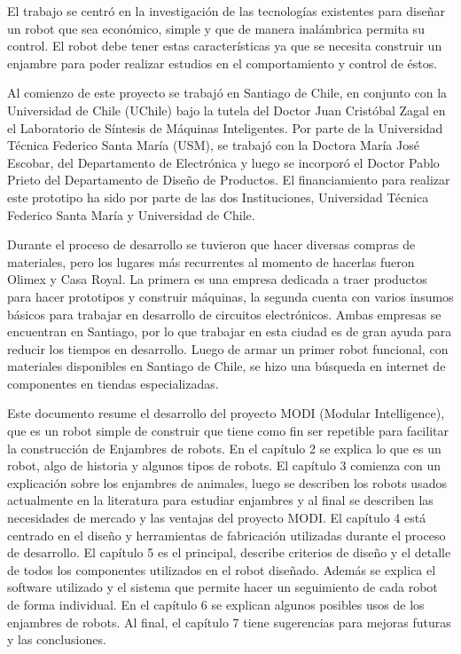 El trabajo se centró en la investigación de las tecnologías existentes para diseñar un robot que sea económico, simple y que de manera inalámbrica permita su control. El robot debe tener estas características ya que se necesita construir un enjambre para poder realizar estudios en el comportamiento y control de éstos.

Al comienzo de este proyecto se trabajó en Santiago de Chile, en conjunto con la Universidad de Chile (UChile) bajo la tutela del Doctor Juan Cristóbal Zagal en el Laboratorio de Síntesis de Máquinas Inteligentes. Por parte de la Universidad Técnica Federico Santa María (USM), se trabajó con la Doctora María José Escobar, del Departamento de Electrónica y luego se incorporó el Doctor Pablo Prieto del Departamento de Diseño de Productos. El financiamiento para realizar este prototipo ha sido por parte de las dos Instituciones, Universidad Técnica Federico Santa María y Universidad de Chile.

Durante el proceso de desarrollo se tuvieron que hacer diversas compras de materiales, pero los lugares más recurrentes al momento de hacerlas fueron Olimex y Casa Royal. La primera es una empresa dedicada a traer productos para hacer prototipos y construir máquinas, la segunda cuenta con varios insumos básicos para trabajar en desarrollo de circuitos electrónicos. Ambas empresas se encuentran en Santiago, por lo que trabajar en esta ciudad es de gran ayuda para reducir los tiempos en desarrollo.
Luego de armar un primer robot funcional, con materiales disponibles en Santiago de Chile, se hizo una búsqueda en internet de componentes en tiendas especializadas.

Este documento resume el desarrollo del proyecto MODI (Modular Intelligence), que es un robot simple de construir que tiene como fin ser repetible para facilitar la construcción de Enjambres de robots. En el capítulo 2 se explica lo que es un robot, algo de historia y algunos tipos de robots. El capítulo 3 comienza con un explicación sobre los enjambres de animales, luego se describen los robots usados actualmente en la literatura para estudiar enjambres y al final se describen las necesidades de mercado y las ventajas del proyecto MODI. El capítulo 4 está centrado en el diseño y herramientas de fabricación utilizadas durante el proceso de desarrollo. El capítulo 5 es el principal, describe criterios de diseño y el detalle de todos los componentes utilizados en el robot diseñado. Además se explica el software utilizado y el sistema que permite hacer un seguimiento de cada robot de forma individual. En el capítulo 6 se explican algunos posibles usos de los enjambres de robots. Al final, el capítulo 7 tiene sugerencias para mejoras futuras y las conclusiones. 

